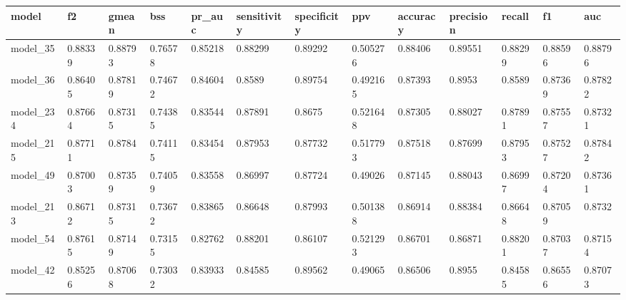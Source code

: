 \begin{tabular}{|l|l|l|l|l|l|l|l|l|l|l|l|l|}
\hline
\textbf{model} & \textbf{f2} & \textbf{gmean} & \textbf{bss} & \textbf{pr\_auc} & \textbf{sensitivity} & \textbf{specificity} & \textbf{ppv} & \textbf{accuracy} & \textbf{precision} & \textbf{recall} & \textbf{f1} & \textbf{auc} \\ \hline
model\_35      & 0.88339     & 0.88793        & 0.76578      & 0.85218          & 0.88299              & 0.89292              & 0.505276     & 0.88406           & 0.89551            & 0.88299         & 0.88596     & 0.88796      \\ \hline
model\_36      & 0.86405     & 0.87819        & 0.74672      & 0.84604          & 0.8589               & 0.89754              & 0.492165     & 0.87393           & 0.8953             & 0.8589          & 0.87369     & 0.87822      \\ \hline
model\_234     & 0.87664     & 0.87315        & 0.74385      & 0.83544          & 0.87891              & 0.8675               & 0.521648     & 0.87305           & 0.88027            & 0.87891         & 0.87557     & 0.87321      \\ \hline
model\_215     & 0.87711     & 0.8784         & 0.74115      & 0.83454          & 0.87953              & 0.87732              & 0.517793     & 0.87518           & 0.87699            & 0.87953         & 0.87527     & 0.87842      \\ \hline
model\_49      & 0.87003     & 0.87359        & 0.74059      & 0.83558          & 0.86997              & 0.87724              & 0.49026      & 0.87145           & 0.88043            & 0.86997         & 0.87204     & 0.87361      \\ \hline
model\_213     & 0.86712     & 0.87315        & 0.73672      & 0.83865          & 0.86648              & 0.87993              & 0.501388     & 0.86914           & 0.88384            & 0.86648         & 0.87059     & 0.8732       \\ \hline
model\_54      & 0.87615     & 0.87149        & 0.73155      & 0.82762          & 0.88201              & 0.86107              & 0.521293     & 0.86701           & 0.86871            & 0.88201         & 0.87037     & 0.87154      \\ \hline
model\_42      & 0.85256     & 0.87068        & 0.73032      & 0.83933          & 0.84585              & 0.89562              & 0.49065      & 0.86506           & 0.8955             & 0.84585         & 0.86556     & 0.87073      \\ \hline

\end{tabular}
